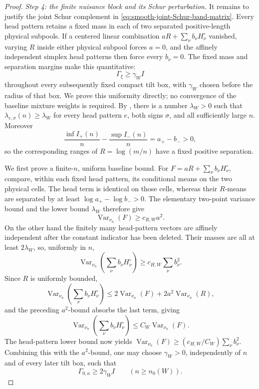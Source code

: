 \documentclass[11pt]{article}
\numberwithin{equation}{section}
\theoremstyle{definition}
\theoremstyle{remark}
\newcommand{\1}{\mathbf 1}
\begin{document}
\begin{proof}
\medskip\noindent
\emph{Step 4: the finite nuisance block and its Schur perturbation.}\quad
It remains to justify the joint Schur complement in
\eqref{eq:smooth-joint-Schur-band-matrix}.  Every head pattern retains a
fixed mass in each of two separated positive-length physical subpools.
If a centered linear combination \(aR+\sum_\nu b_\nu H_\nu^\circ\)
vanished, varying \(R\) inside either physical subpool forces \(a=0\),
and the affinely independent simplex head patterns then force every
\(b_\nu=0\).  The fixed mass and separation margins make this quantitative:
\begin{equation}
 \Gamma_\xi\geq\gamma_W I
 \label{eq:smooth-joint-head-physical-gap}
\end{equation}
throughout every subsequently fixed compact tilt box, with
\(\gamma_W\) chosen before the radius of that box.  We prove this
uniformity directly; no convergence of the baseline mixture weights is
required.  By
, there is a number
\(\lambda_W>0\) such that
\(\lambda_{e,\sigma}(n)\geq\lambda_W\) for every head pattern \(e\),
both signs \(\sigma\), and all sufficiently large \(n\).  Moreover
\[
 \frac{\inf I_+(n)}n-\frac{\sup I_-(n)}n=a_+-b_->0,
\]
so the corresponding ranges of \(R=\log(m/n)\) have a fixed positive
separation.

We first prove a finite-\(n\), uniform baseline bound.  For
\(F=aR+\sum_\nu b_\nu H_\nu^\circ\), compare, within each fixed head
pattern, its conditional means on the two physical cells.  The head term
is identical on those cells, whereas their \(R\)-means are separated by
at least \(\log a_+-\log b_->0\).  The elementary two-point variance
bound and the lower bound \(\lambda_W\) therefore give
\[
                         \operatorname{Var}_{\nu_n}(F)\geq c_{R,W}a^2.
\]
On the other hand the finitely many head-pattern vectors are affinely
independent after the constant indicator has been deleted.  Their masses
are all at least \(2\lambda_W\), so, uniformly in \(n\),
\[
 \operatorname{Var}_{\nu_n}\!\left(\sum_\nu b_\nu H_\nu^\circ\right)
       \geq c_{H,W}\sum_\nu b_\nu^2.
\]
Since \(R\) is uniformly bounded,
\[
 \operatorname{Var}_{\nu_n}\!\left(\sum_\nu b_\nu H_\nu^\circ\right)
 \leq2\operatorname{Var}_{\nu_n}(F)
      +2a^2\operatorname{Var}_{\nu_n}(R),
\]
and the preceding \(a^2\)-bound absorbs the last term, giving
\[
 \operatorname{Var}_{\nu_n}\!\left(\sum_\nu b_\nu H_\nu^\circ\right)
 \leq C_W\operatorname{Var}_{\nu_n}(F).
\]
The head-pattern lower bound now yields
\(\operatorname{Var}_{\nu_n}(F)\geq(c_{H,W}/C_W)\sum_\nu b_\nu^2\).
Combining this with the \(a^2\)-bound, one may
choose \(\gamma_W>0\), independently of \(n\) and of every later tilt
box, such that
\[
 \Gamma_{0,n}\geq2\gamma_W I
 \qquad(n\geq n_0(W)).
\]


\end{proof}
\end{document}
